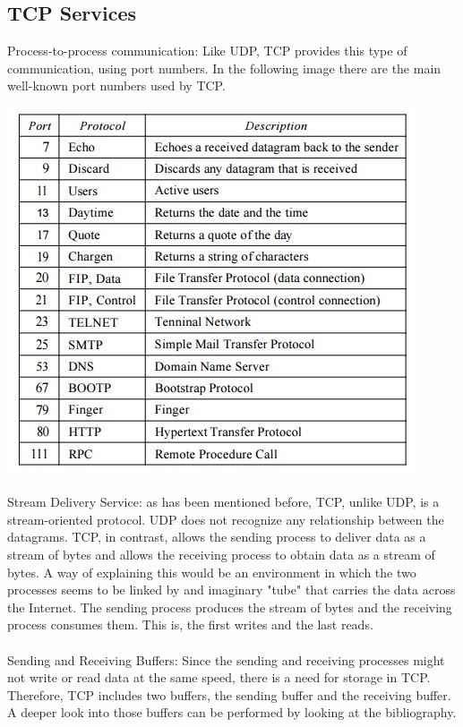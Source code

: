 \documentclass[12pt,a4paper]{report}
\begin{document}
\subsection{TCP Services}
Process-to-process communication: Like UDP, TCP provides this type of communication, using port numbers. In the following image there are the main well-known port numbers used by TCP.

\includegraphics{TCP1}

\paragraph{}
Stream Delivery Service: as has been mentioned before, TCP, unlike UDP, is a stream-oriented protocol. UDP does not recognize any relationship between the datagrams. TCP, in contrast, allows the sending process to deliver data as a stream of bytes and allows the receiving process to obtain data as a stream of bytes. A way of explaining this would be an environment in which the two processes seems to be linked by and imaginary "tube" that carries the data across the Internet. The sending process produces the stream of bytes and the receiving process consumes them. This is, the first writes and the last reads. 

\paragraph{}
Sending and Receiving Buffers: Since the sending and receiving processes might not write or read data at the same speed, there is a need for storage in TCP. Therefore, TCP includes two buffers, the sending buffer and the receiving buffer. A deeper look into those buffers can be performed by looking at the bibliography. 
\end{document}
